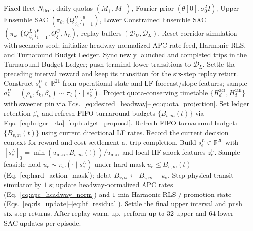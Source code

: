 \begin{algorithm}[t]
\caption{\texttt{FreqDuet}: Frequency-Separated Turnaround-Budgeted Bi-Level Constrained SAC}
\label{alg:freqduet}
\footnotesize
\begin{algorithmic}[1]
\Require Fixed fleet $N_{\mathrm{fleet}}$, daily quotas $(M_+, M_-)$, Fourier prior $(\theta[0], \sigma_0^2 I)$, Upper Ensemble SAC $(\pi_\theta, \{Q^U_{\phi_i}\}_{i=1}^6)$, Lower Constrained Ensemble SAC $(\pi_\omega, \{Q^L_{\psi_i}\}_{i=1}^6, Q^C_\xi, \lambda_L)$, replay buffers $(\mathcal{D}_U, \mathcal{D}_L)$.
  \State Reset corridor simulation with scenario seed; initialize headway-normalized APC rate feed, Harmonic-RLS, and Turnaround Budget Ledger.
    \State Sync newly launched and completed trips in the Turnaround Budget Ledger; push terminal lower transitions to $\mathcal{D}_L$.
     
      \State Settle the preceding interval reward and keep its transition for the six-step replay return.
      \State Construct $s^U_k \in \mathbb{R}^{21}$ from operational state and LF forecast/slope features; sample $a^U_k = (\rho_k, \delta_k, \beta_k) \sim \pi_\theta(\cdot \mid s^U_k)$.
      \State Project quota-conserving timetable $\{H^{\mathrm{act}}_d, H^{\mathrm{tail}}_d\}$ with sweeper pin via Eqs.~\eqref{eq:desired_headway}--\eqref{eq:quota_projection}.
      \State Set ledger retention $\beta_k$ and refresh FIFO turnaround budgets $\{B_{v,m}(t)\}$ via Eqs.~\eqref{eq:ledger_eta}--\eqref{eq:budget_proposal}.
      \State Refresh FIFO turnaround budgets $\{B_{v,m}(t)\}$ using current directional LF rates.
    \EndIf
      \State Record the current decision context for reward and cost settlement at trip completion.
      \State Build $s^L_e \in \mathbb{R}^{20}$ with $[s^L_e]_0 = \min(u_{\max}, B_{v,m}(t))/u_{\max}$ and local HF shock features $z^{\mathrm{L}}_e$.
      \State Sample feasible hold $u_e \sim \pi_\omega(\cdot \mid s^L_e)$ under hard mask $u_e \le B_{v,m}(t)$ (Eq.~\eqref{eq:hard_action_mask}); debit $B_{v,m} \leftarrow B_{v,m} - u_e$.
    \EndFor
    \State Step physical transit simulator by $1\text{ s}$; update headway-normalized APC rates (Eq.~\eqref{eq:apc_headway_norm}) and $1\text{-min}$ Harmonic-RLS / promotion state (Eqs.~\eqref{eq:rls_update}--\eqref{eq:hf_residual}).
  \EndWhile
  \State Settle the final upper interval and push six-step returns. After replay warm-up, perform up to 32 upper and 64 lower SAC updates per episode.
\EndFor
\end{algorithmic}
\end{algorithm}
